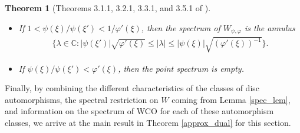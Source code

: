 \documentclass{amsart}
\newtheorem{thm}{Theorem}[section]
\theoremstyle{definition}
\theoremstyle{remark}
\numberwithin{equation}{section}
\begin{document}
\begin{thm}[Theorems 3.1.1, 3.2.1, 3.3.1, and 3.5.1 of \cite{gunatillake2011invertible}]
\begin{itemize}
\begin{itemize}
\begin{align*}
            \end{align*}
            \item[b.] If $1<\psi(\xi)/\psi(\xi')<1/\varphi'(\xi)$, then the spectrum of $W_{\psi,\varphi}$ is the annulus
            \begin{align*}
                 \{\lambda \in \mathbb{C}:|\psi(\xi')|\sqrt{\varphi'(\xi)}\leq|\lambda|\leq|\psi(\xi)|\sqrt{\left(\varphi'(\xi)\right)^{-1}}\}.
            \end{align*}
            \item[c.] If $\psi(\xi)/\psi(\xi')<\varphi'(\xi)$, then the point spectrum is empty.
        \end{itemize}
    \end{itemize}
\end{thm}

Finally, by combining the different characteristics of the classes of disc automorphisms, the spectral restriction on $W$ coming from Lemma \ref{spec_lem}, and information on the spectrum of WCO for each of these automorphism classes, we arrive at the main result in Theorem \ref{approx_dual} for this section. 
\end{document}
